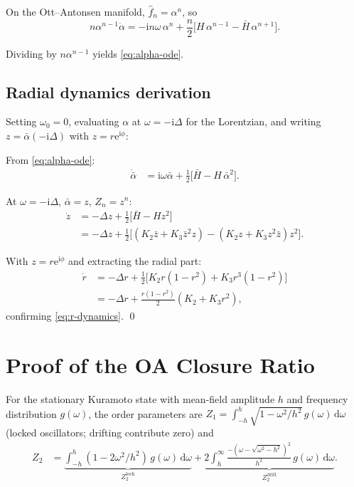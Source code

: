 \documentclass{article}
\newcommand{\dd}{\mathrm{d}}
\newcommand{\ii}{\mathrm{i}}
\newcommand{\ee}{\mathrm{e}}
\begin{document}
On the Ott--Antonsen manifold, $\hat{f}_n=\alpha^n$, so
\begin{equation}
  n\alpha^{n-1}\dot{\alpha} = -\ii n\omega\,\alpha^n
  + \frac{n}{2}\bigl[H\,\alpha^{n-1} - \bar{H}\,\alpha^{n+1}\bigr].
\end{equation}

Dividing by $n\alpha^{n-1}$ yields \eqref{eq:alpha-ode}.

\subsection{Radial dynamics derivation}

Setting $\omega_0=0$, evaluating $\alpha$ at $\omega=-\ii\Delta$ for the
Lorentzian, and writing $z=\bar{\alpha}(-\ii\Delta)$ with $z=r\ee^{\ii\phi}$:

From \eqref{eq:alpha-ode}:
\begin{align}
  \dot{\bar{\alpha}} &= \ii\omega\bar{\alpha}
  + \frac{1}{2}\bigl[\bar{H} - H\,\bar{\alpha}^2\bigr].
\end{align}

At $\omega=-\ii\Delta$, $\bar{\alpha}=z$, $Z_n=z^n$:
\begin{align}
  \dot{z} &= -\Delta z + \frac{1}{2}\bigl[\bar{H} - H z^2\bigr] \\
  &= -\Delta z + \frac{1}{2}\bigl[
    (K_2\bar{z} + K_3\bar{z}^2 z) - (K_2 z + K_3 z^2\bar{z})z^2
  \bigr].
\end{align}

With $z=r\ee^{\ii\phi}$ and extracting the radial part:
\begin{align}
  \dot{r} &= -\Delta r + \frac{1}{2}\bigl[K_2 r(1-r^2) + K_3 r^3(1-r^2)\bigr] \\
  &= -\Delta r + \frac{r(1-r^2)}{2}(K_2+K_3 r^2),
\end{align}
confirming \eqref{eq:r-dynamics}.  \qed


\section{Proof of the OA Closure Ratio}
\label{app:closure-ratio}

For the stationary Kuramoto state with mean-field amplitude $h$ and
frequency distribution $g(\omega)$, the order parameters are
$Z_1 = \int_{-h}^{h}\sqrt{1-\omega^2/h^2}\,g(\omega)\,\dd\omega$
(locked oscillators; drifting contribute zero) and
\begin{align}
  Z_2 &= \underbrace{\int_{-h}^{h}(1-2\omega^2/h^2)\,g(\omega)\,\dd\omega}_{Z_2^{\mathrm{lock}}}
  + \underbrace{2\int_{h}^{\infty}\!\frac{-(\omega-\sqrt{\omega^2-h^2})^2}{h^2}\,g(\omega)\,\dd\omega}_{Z_2^{\mathrm{drift}}}.
\end{align}
\end{document}
